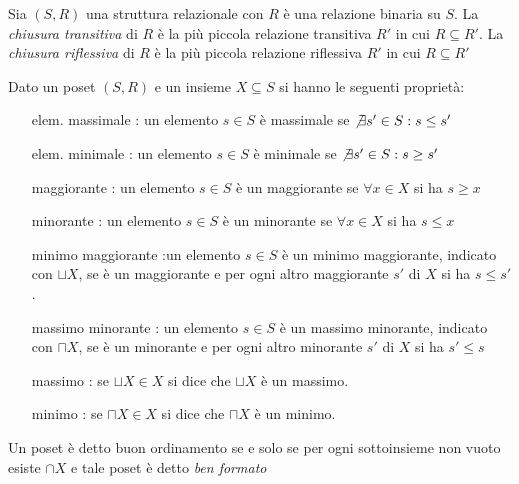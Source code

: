Sia $(S,R)$ una struttura relazionale con $R$ è una relazione binaria su $S$.\newline
La \emph{chiusura transitiva} di $R$ è la più piccola relazione transitiva $R'$ in cui $R \subseteq R'$.
La \emph{chiusura riflessiva} di $R$ è la più piccola relazione riflessiva $R'$ in cui $R \subseteq R'$

\begin{prop}
Dato un poset $(S,R)$ e un insieme $X \subseteq S$ si hanno le seguenti proprietà:
\end{prop}
\begin{enumerate}
    \item[elem. massimale]: un elemento $s \in S$ è massimale se $\not \exists s' \in S : s \leq s'$
    \item[elem. minimale]: un elemento $s \in S$ è minimale se $\not \exists s' \in S : s \geq s'$
    \item[maggiorante]: un elemento $s \in S$ è un maggiorante se $\forall x \in X$ si ha $s \geq x$
    \item[minorante]: un elemento $s \in S$ è un minorante se $\forall x \in X$ si ha $s \leq x$
    \item[minimo maggiorante]:un elemento $s \in S$ è un minimo maggiorante, indicato con $\sqcup X$,
          se è un maggiorante e per ogni altro maggiorante $s'$ di $X$ si ha $s \leq s'$.
    \item[massimo minorante]: un elemento $s \in S$ è un massimo minorante, indicato con $\sqcap X$,
          se è un minorante e per ogni altro minorante $s'$ di $X$ si ha $s' \leq s$
    \item[massimo]: se $\sqcup X \in X$ si dice che $\sqcup X$ è un massimo.
    \item[minimo]: se $\sqcap X \in X$ si dice che $\sqcap X$ è un minimo.
\end{enumerate}

\begin{defi}
    Un poset è detto buon ordinamento se e solo se per ogni sottoinsieme non vuoto esiste
    $\cap X$ e tale poset è detto \emph{ben formato}
\end{defi}

